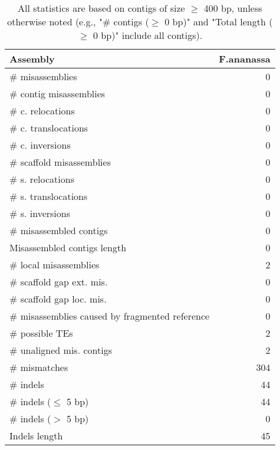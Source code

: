 \documentclass[12pt,a4paper]{article}
\begin{document}
\begin{table}[ht]
\begin{center}
\caption{All statistics are based on contigs of size $\geq$ 400 bp, unless otherwise noted (e.g., "\# contigs ($\geq$ 0 bp)" and "Total length ($\geq$ 0 bp)" include all contigs).}
\begin{tabular}{|l*{1}{|r}|}
\hline
Assembly & F.ananassa \\ \hline
\# misassemblies & 0 \\ \hline
\hspace{2mm}\# contig misassemblies & 0 \\ \hline
\hspace{5mm}\# c. relocations & 0 \\ \hline
\hspace{5mm}\# c. translocations & 0 \\ \hline
\hspace{5mm}\# c. inversions & 0 \\ \hline
\hspace{2mm}\# scaffold misassemblies & 0 \\ \hline
\hspace{5mm}\# s. relocations & 0 \\ \hline
\hspace{5mm}\# s. translocations & 0 \\ \hline
\hspace{5mm}\# s. inversions & 0 \\ \hline
\# misassembled contigs & 0 \\ \hline
Misassembled contigs length & 0 \\ \hline
\# local misassemblies & 2 \\ \hline
\# scaffold gap ext. mis. & 0 \\ \hline
\# scaffold gap loc. mis. & 0 \\ \hline
\# misassemblies caused by fragmented reference & 0 \\ \hline
\# possible TEs & 2 \\ \hline
\# unaligned mis. contigs & 2 \\ \hline
\# mismatches & 304 \\ \hline
\# indels & 44 \\ \hline
\hspace{5mm}\# indels ($\leq$ 5 bp) & 44 \\ \hline
\hspace{5mm}\# indels ($>$ 5 bp) & 0 \\ \hline
Indels length & 45 \\ \hline
\end{tabular}
\end{center}
\end{table}
\end{document}
